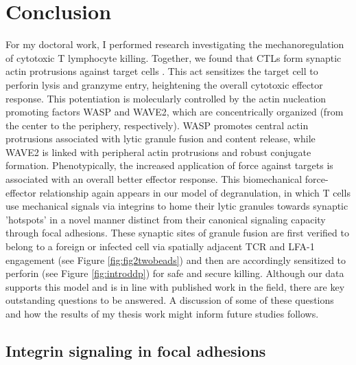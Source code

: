 \section{Conclusion} 

For my doctoral work, I performed research investigating the mechanoregulation of cytotoxic T lymphocyte killing. Together, we found that CTLs form synaptic actin protrusions against target cells \cite{Tamzalit2018}. This act sensitizes the target cell to perforin lysis and granzyme entry, heightening the overall cytotoxic effector response. This potentiation is molecularly controlled by the actin nucleation promoting factors WASP and WAVE2, which are concentrically organized (from the center to the periphery, respectively). WASP promotes central actin protrusions associated with lytic granule fusion and content release, while WAVE2 is linked with peripheral actin protrusions and robust conjugate formation. Phenotypically, the increased application of force against targets is associated with an overall better effector response. This biomechanical force-effector relationship again appears in our model of degranulation, in which T cells use mechanical signals via integrins to home their lytic granules towards synaptic 'hotspots' in a novel manner distinct from their canonical signaling capacity through focal adhesions. These synaptic sites of granule fusion are first verified to belong to a foreign or infected cell via spatially adjacent TCR and LFA-1 engagement (see Figure \ref{fig:fig2twobeads}) and then are accordingly sensitized to perforin (see Figure \ref{fig:introddp}) for safe and secure killing. Although our data supports this model and is in line with published work in the field, there are key outstanding questions to be answered. A discussion of some of these questions and how the results of my thesis work might inform future studies follows.

\subsection{Integrin signaling in focal adhesions}


